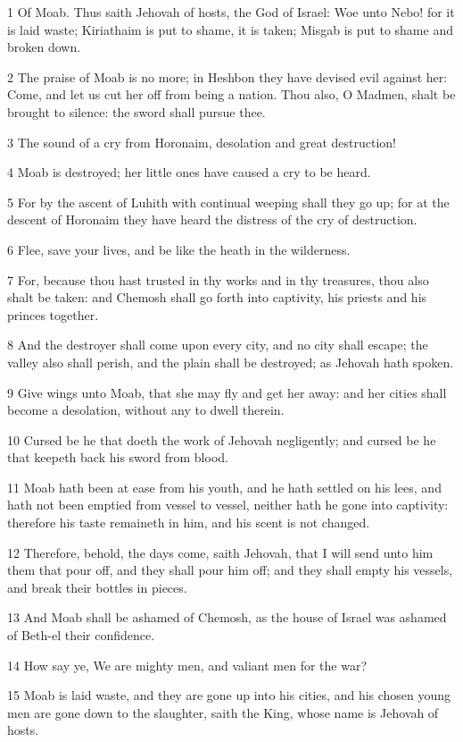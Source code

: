 \par 1 Of Moab. Thus saith Jehovah of hosts, the God of Israel: Woe unto Nebo! for it is laid waste; Kiriathaim is put to shame, it is taken; Misgab is put to shame and broken down.
\par 2 The praise of Moab is no more; in Heshbon they have devised evil against her: Come, and let us cut her off from being a nation. Thou also, O Madmen, shalt be brought to silence: the sword shall pursue thee.
\par 3 The sound of a cry from Horonaim, desolation and great destruction!
\par 4 Moab is destroyed; her little ones have caused a cry to be heard.
\par 5 For by the ascent of Luhith with continual weeping shall they go up; for at the descent of Horonaim they have heard the distress of the cry of destruction.
\par 6 Flee, save your lives, and be like the heath in the wilderness.
\par 7 For, because thou hast trusted in thy works and in thy treasures, thou also shalt be taken: and Chemosh shall go forth into captivity, his priests and his princes together.
\par 8 And the destroyer shall come upon every city, and no city shall escape; the valley also shall perish, and the plain shall be destroyed; as Jehovah hath spoken.
\par 9 Give wings unto Moab, that she may fly and get her away: and her cities shall become a desolation, without any to dwell therein.
\par 10 Cursed be he that doeth the work of Jehovah negligently; and cursed be he that keepeth back his sword from blood.
\par 11 Moab hath been at ease from his youth, and he hath settled on his lees, and hath not been emptied from vessel to vessel, neither hath he gone into captivity: therefore his taste remaineth in him, and his scent is not changed.
\par 12 Therefore, behold, the days come, saith Jehovah, that I will send unto him them that pour off, and they shall pour him off; and they shall empty his vessels, and break their bottles in pieces.
\par 13 And Moab shall be ashamed of Chemosh, as the house of Israel was ashamed of Beth-el their confidence.
\par 14 How say ye, We are mighty men, and valiant men for the war?
\par 15 Moab is laid waste, and they are gone up into his cities, and his chosen young men are gone down to the slaughter, saith the King, whose name is Jehovah of hosts.
